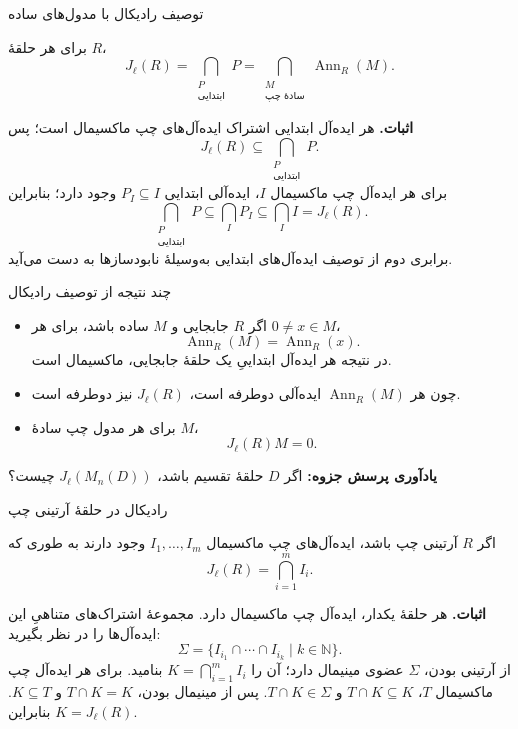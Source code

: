 \begin{frame}[t]{توصیف رادیکال با مدول‌های ساده}
\label{lec15:radical-annihilators}
\begin{theorem}
برای هر حلقهٔ \(R\)،
\[
 J_\ell(R)
 =\bigcap_{\substack{P\\\text{ابتدایی}}}P
 =\bigcap_{\substack{M\\\text{سادهٔ چپ}}}\operatorname{Ann}_R(M).
\]
\end{theorem}
\textbf{اثبات.} هر ایده‌آل ابتدایی اشتراک ایده‌آل‌های چپ ماکسیمال است؛ پس
\[
 J_\ell(R)\subseteq\bigcap_{\substack{P\\\text{ابتدایی}}}P.
\]
برای هر ایده‌آل چپ ماکسیمال \(I\)، ایده‌آلی ابتدایی \(P_I\subseteq I\) وجود دارد؛ بنابراین
\[
 \bigcap_{\substack{P\\\text{ابتدایی}}}P\subseteq\bigcap_I P_I
 \subseteq\bigcap_I I=J_\ell(R).
\]
برابری دوم از توصیف ایده‌آل‌های ابتدایی به‌وسیلهٔ نابودسازها به دست می‌آید.
\end{frame}

\begin{frame}[t]{چند نتیجه از توصیف رادیکال}
\label{lec15:radical-consequences}
\begin{itemize}
\item اگر \(R\) جابجایی و \(M\) ساده باشد، برای هر \(0\ne x\in M\)،
\[
 \operatorname{Ann}_R(M)=\operatorname{Ann}_R(x).
\]
در نتیجه هر ایده‌آل ابتداییِ یک حلقهٔ جابجایی، ماکسیمال است.
\item چون هر \(\operatorname{Ann}_R(M)\) ایده‌آلی دوطرفه است، \(J_\ell(R)\) نیز دوطرفه است.
\item برای هر مدول چپ سادهٔ \(M\)،
\[
 J_\ell(R)M=0.
\]
\end{itemize}
\textbf{یادآوری پرسش جزوه:} اگر \(D\) حلقهٔ تقسیم باشد، \(J_\ell(M_n(D))\) چیست؟
\end{frame}

\begin{frame}[t]{رادیکال در حلقهٔ آرتینی چپ}
\label{lec15:finite-intersection}
\begin{theorem}
اگر \(R\) آرتینی چپ باشد، ایده‌آل‌های چپ ماکسیمال \(I_1,\ldots,I_m\) وجود دارند به طوری که
\[
 J_\ell(R)=\bigcap_{i=1}^{m}I_i.
\]
\end{theorem}
\textbf{اثبات.} هر حلقهٔ یکدار، ایده‌آل چپ ماکسیمال دارد. مجموعهٔ اشتراک‌های متناهیِ این ایده‌آل‌ها را در نظر بگیرید:
\[
 \Sigma=\{I_{i_1}\cap\cdots\cap I_{i_k}\mid k\in\mathbb N\}.
\]
از آرتینی بودن، \(\Sigma\) عضوی مینیمال دارد؛ آن را \(K=\bigcap_{i=1}^m I_i\) بنامید.
برای هر ایده‌آل چپ ماکسیمال \(T\)، \(T\cap K\subseteq K\) و \(T\cap K\in\Sigma\).
پس از مینیمال بودن، \(T\cap K=K\) و \(K\subseteq T\). بنابراین \(K=J_\ell(R)\).
\end{frame}

